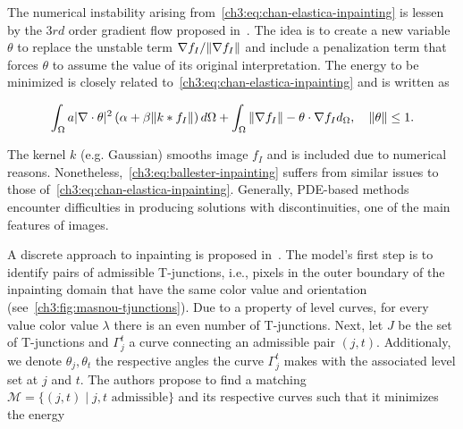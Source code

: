 The numerical instability arising from~\cref{ch3:eq:chan-elastica-inpainting} is lessen by the $3rd$ order gradient flow proposed in~\cite{ballester01filling}. The idea is to create a new variable $\theta$ to replace the unstable term $\nabla f_I / \lVert\nabla f_I\rVert$ and include a penalization term that forces $\theta$ to assume the value of its original interpretation. The energy to be minimized is closely related to~\cref{ch3:eq:chan-elastica-inpainting} and is written as

\begin{align}
	\int_{\Omega}{a|\nabla \cdot \theta|^2\left(\alpha + \beta \lVert k * f_I\rVert\right)d\Omega} + \int_{\Omega}{ \lVert\nabla f_I\rVert - \theta \cdot \nabla f_I d_{\Omega}},\quad \lVert\theta\rVert \leq 1.
	\label{ch3:eq:ballester-inpainting}
\end{align}

The kernel $k$ (e.g. Gaussian) smooths image $f_I$ and is included due to numerical reasons. Nonetheless,~\cref{ch3:eq:ballester-inpainting} suffers from similar issues to those of~\cref{ch3:eq:chan-elastica-inpainting}. Generally, PDE-based methods encounter difficulties in producing solutions with discontinuities, one of the main features of images.

A discrete approach to inpainting is proposed in~\cite{masnou98inpainting}. The model's first step is to identify pairs of admissible T-junctions, i.e., pixels in the outer boundary of the inpainting domain that have the same color value and orientation (see~\cref{ch3:fig:masnou-tjunctions}). Due to a property of level curves, for every value color value $\lambda$ there is an even number of T-junctions. Next, let $J$ be the set of T-junctions and $\Gamma_j^t$ a curve connecting an admissible pair $(j,t)$. Additionaly, we denote $\theta_j,\theta_t$ the respective angles the curve $\Gamma_j^t$ makes with the associated level set at $j$ and $t$. The authors propose to find a matching $\mathcal{M}=\{ (j,t) \; | \; j,t\text{ admissible} \}$ and its respective curves such that it minimizes the energy


